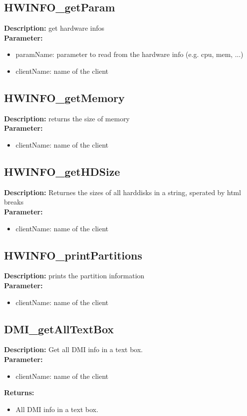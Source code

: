 \subsection{HWINFO\_getParam}
\textbf{Description:} get hardware infos\\
\textbf{Parameter:}
\begin{itemize}
\item paramName: parameter to read from the hardware info (e.g. cpu, mem, ...)
\item clientName: name of the client
\end{itemize}

\subsection{HWINFO\_getMemory}
\textbf{Description:} returns the size of memory\\
\textbf{Parameter:}
\begin{itemize}
\item clientName: name of the client
\end{itemize}

\subsection{HWINFO\_getHDSize}
\textbf{Description:} Returnes the sizes of all harddisks in a string, sperated by html breaks\\
\textbf{Parameter:}
\begin{itemize}
\item clientName: name of the client
\end{itemize}

\subsection{HWINFO\_printPartitions}
\textbf{Description:} prints the partition information\\
\textbf{Parameter:}
\begin{itemize}
\item clientName: name of the client
\end{itemize}

\subsection{DMI\_getAllTextBox}
\textbf{Description:} Get all DMI info in a text box.\\
\textbf{Parameter:}
\begin{itemize}
\item clientName: name of the client
\end{itemize}
\textbf{Returns:}
\begin{itemize}
\item All DMI info in a text box.
\end{itemize}

